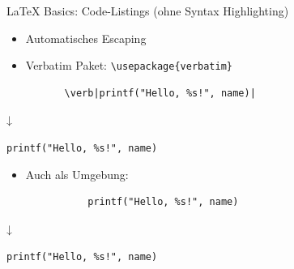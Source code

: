 \documentclass[main.tex]{subfiles}
\begin{document}
\begin{frame}[fragile]{\LaTeX{} Basics: Code-Listings (ohne Syntax Highlighting)}
	\begin{itemize}
		\item Automatisches Escaping
		      \pause
		\item Verbatim Paket: \verb|\usepackage{verbatim}|
	\end{itemize}
	\pause
	\vspace{-10pt}
	\begin{center}
		\begin{verbatim}
          \verb|printf("Hello, %s!", name)|
        \end{verbatim}
		\vspace{-17pt}
		↓

		\verb|printf("Hello, %s!", name)|
	\end{center}
	\pause
	\vspace{-7pt}
	\begin{itemize}
		\item Auch als Umgebung:
	\end{itemize}
	\pause
	\vspace{-10pt}
	\begin{center}
		\begin{metaverbatim}
			\begin{verbatim}
              printf("Hello, %s!", name)
            \end{verbatim}
		\end{metaverbatim}
		\vspace{-30pt}
		↓

		\verb|printf("Hello, %s!", name)|
	\end{center}
\end{frame}
\end{document}
